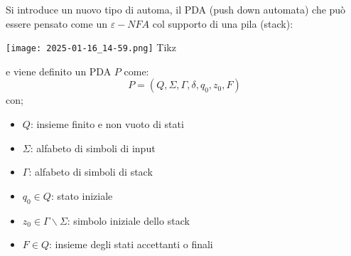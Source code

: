 	Si introduce un nuovo tipo di automa, il PDA (push down automata) che può essere pensato come un $\varepsilon-NFA$ col supporto di una pila (stack):
	\begin{center}
	\texttt{[image: 2025-01-16\_14-59.png]}
	Tikz
	\end{center}
	e viene definito un PDA $P$ come:
	$$P=(Q,\Sigma,\Gamma,\delta,q_0,z_0,F)$$
	con;
	\begin{itemize}
		\item $Q$: insieme finito e non vuoto di stati
		\item $\Sigma$: alfabeto di simboli di input
		\item $\Gamma$: alfabeto di simboli di stack
		\item $q_0\in Q$: stato iniziale
		\item $z_0\in \Gamma\backslash \Sigma$: simbolo iniziale dello stack
		\item $F\in Q$: insieme degli stati accettanti o finali
	\end{itemize}
